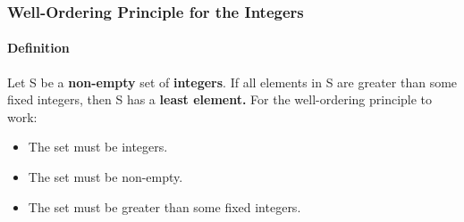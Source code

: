 \subsubsection*{Well-Ordering Principle for the Integers}
\paragraph*{Definition}
Let S be a \textbf{non-empty} set of \textbf{integers}. If all elements in S are greater than some fixed integers, then S has a \textbf{least element.}
For the well-ordering principle to work:
\begin{itemize}
    \item The set must be integers.
    \item The set must be non-empty.
    \item The set must be greater than some fixed integers.
\end{itemize}